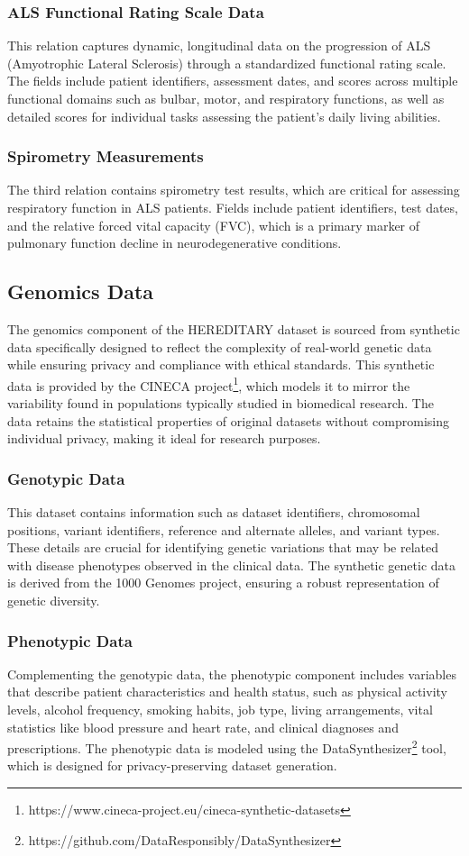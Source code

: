 \subsubsection{ALS Functional Rating Scale Data}
This relation captures dynamic, longitudinal data on the progression of ALS (Amyotrophic Lateral Sclerosis) through a standardized functional rating scale. The fields include patient identifiers, assessment dates, and scores across multiple functional domains such as bulbar, motor, and respiratory functions, as well as detailed scores for individual tasks assessing the patient's daily living abilities. 
\subsubsection{Spirometry Measurements}
The third relation contains spirometry test results, which are critical for assessing respiratory function in ALS patients. Fields include patient identifiers, test dates, and the relative forced vital capacity (FVC), which is a primary marker of pulmonary function decline in neurodegenerative conditions.
\subsection{Genomics Data}
The genomics component of the HEREDITARY dataset is sourced from synthetic data specifically designed to reflect the complexity of real-world genetic data while ensuring privacy and compliance with ethical standards. This synthetic data is provided by the CINECA project\footnote{https://www.cineca-project.eu/cineca-synthetic-datasets}, which models it to mirror the variability found in populations typically studied in biomedical research. The data retains the statistical properties of original datasets without compromising individual privacy, making it ideal for research purposes.
\subsubsection{Genotypic Data}
This dataset contains information such as dataset identifiers, chromosomal positions, variant identifiers, reference and alternate alleles, and variant types. These details are crucial for identifying genetic variations that may be related with disease phenotypes observed in the clinical data. The synthetic genetic data is derived from the 1000 Genomes project, ensuring a robust representation of genetic diversity.
\subsubsection{Phenotypic Data}
Complementing the genotypic data, the phenotypic component includes variables that describe patient characteristics and health status, such as physical activity levels, alcohol frequency, smoking habits, job type, living arrangements, vital statistics like blood pressure and heart rate, and clinical diagnoses and prescriptions. The phenotypic data is modeled using the DataSynthesizer\footnote{https://github.com/DataResponsibly/DataSynthesizer} tool, which is designed for privacy-preserving dataset generation.